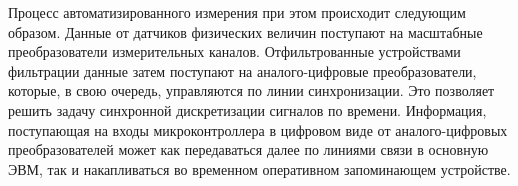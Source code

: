 \documentclass[a4paper, 14pt]{extarticle}
\begin{document}
  Процесс автоматизированного измерения при этом происходит следующим образом.
  Данные от датчиков физических величин поступают на масштабные преобразователи измерительных
  каналов. %
  Отфильтрованные устройствами фильтрации данные затем поступают на аналого-цифровые преобразователи, которые, в свою очередь,
  управляются по линии синхронизации. Это позволяет решить задачу синхронной дискретизации сигналов
  по времени. %
  Информация, поступающая на входы микроконтроллера в цифровом виде от аналого-цифровых
  преобразователей может как передаваться далее по линиями связи в основную ЭВМ, так и
  накапливаться во временном оперативном запоминающем устройстве. %

\end{document}
